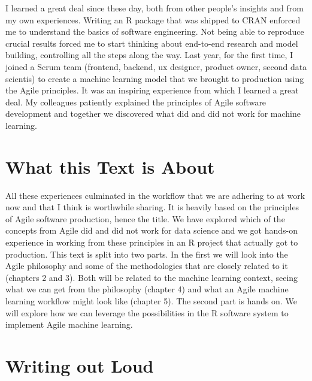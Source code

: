 \documentclass[]{book}
\begin{document}
I learned a great deal since these day, both from other people's insights and from my own experiences. Writing an R package that was shipped to CRAN enforced me to understand the basics of software engineering. Not being able to reproduce crucial results forced me to start thinking about end-to-end research and model building, controlling all the steps along the way. Last year, for the first time, I joined a Scrum team (frontend, backend, ux designer, product owner, second data scientis) to create a machine learning model that we brought to production using the Agile principles. It was an inspiring experience from which I learned a great deal. My colleagues patiently explained the principles of Agile software development and together we discovered what did and did not work for machine learning.

\hypertarget{what-this-text-is-about}{%
\section{What this Text is About}\label{what-this-text-is-about}}

All these experiences culminated in the workflow that we are adhering to at work now and that I think is worthwhile sharing. It is heavily based on the principles of Agile software production, hence the title. We have explored which of the concepts from Agile did and did not work for data science and we got hands-on experience in working from these principles in an R project that actually got to production. This text is split into two parts. In the first we will look into the Agile philosophy and some of the methodologies that are closely related to it (chapters 2 and 3). Both will be related to the machine learning context, seeing what we can get from the philosophy (chapter 4) and what an Agile machine learning workflow might look like (chapter 5). The second part is hands on. We will explore how we can leverage the possibilities in the R software system to implement Agile machine learning.

\hypertarget{writing-out-loud}{%
\section{Writing out Loud}\label{writing-out-loud}}
\end{document}
